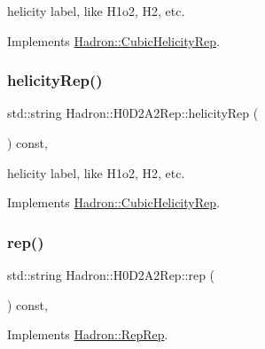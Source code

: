 helicity label, like H1o2, H2, etc. 

Implements \mbox{\hyperlink{structHadron_1_1CubicHelicityRep_af1096946b7470edf0a55451cc662f231}{Hadron\+::\+Cubic\+Helicity\+Rep}}.

\mbox{\label{structHadron_1_1H0D2A2Rep_aa9316edf57dc396c9ff64b842985aa33}} 
\subsubsection{\texorpdfstring{helicityRep()}{helicityRep()}\hspace{0.1cm}{\footnotesize\ttfamily [3/3]}}
{\footnotesize\ttfamily std\+::string Hadron\+::\+H0\+D2\+A2\+Rep\+::helicity\+Rep (\begin{DoxyParamCaption}{ }\end{DoxyParamCaption}) const\hspace{0.3cm}{\ttfamily [inline]}, {\ttfamily [virtual]}}

helicity label, like H1o2, H2, etc. 

Implements \mbox{\hyperlink{structHadron_1_1CubicHelicityRep_af1096946b7470edf0a55451cc662f231}{Hadron\+::\+Cubic\+Helicity\+Rep}}.

\mbox{\label{structHadron_1_1H0D2A2Rep_ae0f8b84aedb60c30e04ff9aa344142a6}} 
\subsubsection{\texorpdfstring{rep()}{rep()}\hspace{0.1cm}{\footnotesize\ttfamily [1/5]}}
{\footnotesize\ttfamily std\+::string Hadron\+::\+H0\+D2\+A2\+Rep\+::rep (\begin{DoxyParamCaption}{ }\end{DoxyParamCaption}) const\hspace{0.3cm}{\ttfamily [inline]}, {\ttfamily [virtual]}}



Implements \mbox{\hyperlink{structHadron_1_1RepRep_ab3213025f6de249f7095892109575fde}{Hadron\+::\+Rep\+Rep}}.

\mbox{\label{structHadron_1_1H0D2A2Rep_ae0f8b84aedb60c30e04ff9aa344142a6}} 
